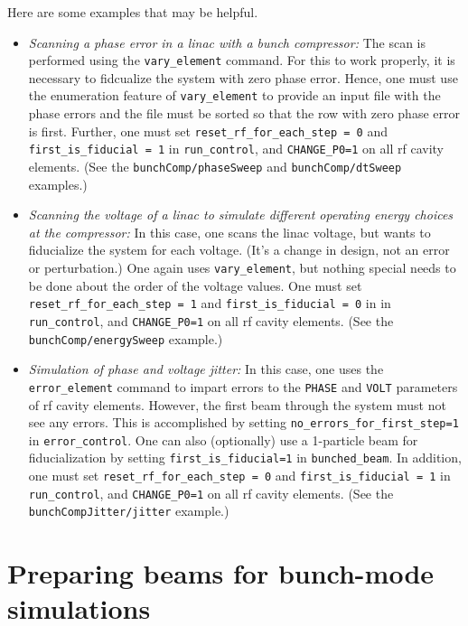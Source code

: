 \documentclass[11pt]{article}
\begin{document}
Here are some examples that may be helpful.  
\begin{itemize}
\item {\em Scanning a phase error in a linac with a bunch compressor:}  The scan is performed using
the \verb|vary_element| command.  For this to work properly, it is necessary to fidcualize the system
with zero phase error.  Hence, one must use the enumeration feature of \verb|vary_element| to provide
an input file with the phase errors and the file must be sorted so that the row with zero phase error
is first.  Further, one must set \verb|reset_rf_for_each_step = 0| and \verb|first_is_fiducial = 1|
in \verb|run_control|, and \verb|CHANGE_P0=1| on all rf cavity elements.  (See the \verb|bunchComp/phaseSweep| 
and \verb|bunchComp/dtSweep| examples.)

\item {\em Scanning the voltage of a linac to simulate different operating energy choices at the compressor:}
In this case, one scans the linac voltage, but wants to fiducialize the system for each voltage.
(It's a change in design, not an error or perturbation.)  One again uses \verb|vary_element|, but
nothing special needs to be done about the order of the voltage values.  One must set
\verb|reset_rf_for_each_step = 1| and \verb|first_is_fiducial = 0| in in \verb|run_control|,
and \verb|CHANGE_P0=1| on all rf cavity elements.  (See the \verb|bunchComp/energySweep| example.)

\item {\em Simulation of phase and voltage jitter:}  In this case, one uses the \verb|error_element|
command to impart errors to the \verb|PHASE| and \verb|VOLT| parameters of rf cavity elements.
However, the first beam through the system must not see any errors.  This is accomplished by
setting \verb|no_errors_for_first_step=1| in \verb|error_control|.  One can also (optionally) use
a 1-particle beam for fiducialization by setting \verb|first_is_fiducial=1| in \verb|bunched_beam|.
In addition, one must set  \verb|reset_rf_for_each_step = 0| and \verb|first_is_fiducial = 1|
in \verb|run_control|, and \verb|CHANGE_P0=1| on all rf cavity elements.  (See the \verb|bunchCompJitter/jitter|
example.)

\end{itemize}

\section{Preparing beams for bunch-mode simulations}\label{sect:bunchedBeams}
\end{document}
